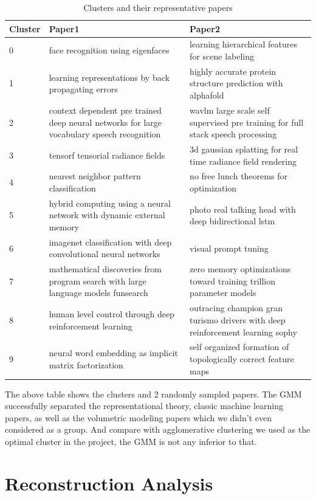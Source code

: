 \documentclass{article}
\begin{document}
\begin{table}
\centering
\begin{tabularx}{\textwidth}{lXX}
\toprule
Cluster & Paper1 & Paper2 \\
\midrule
0 & face recognition using eigenfaces & learning hierarchical features for scene labeling \\
1 & learning representations by back propagating errors & highly accurate protein structure prediction with alphafold \\
2 & context dependent pre trained deep neural networks for large vocabulary speech recognition & wavlm large scale self supervised pre training for full stack speech processing \\
3 & tensorf tensorial radiance fields & 3d gaussian splatting for real time radiance field rendering \\
4 & nearest neighbor pattern classification & no free lunch theorems for optimization \\
5 & hybrid computing using a neural network with dynamic external memory & photo real talking head with deep bidirectional lstm \\
6 & imagenet classification with deep convolutional neural networks & visual prompt tuning \\
7 & mathematical discoveries from program search with large language models funsearch & zero memory optimizations toward training trillion parameter models \\
8 & human level control through deep reinforcement learning & outracing champion gran turismo drivers with deep reinforcement learning sophy \\
9 & neural word embedding as implicit matrix factorization & self organized formation of topologically correct feature maps \\
\bottomrule
\end{tabularx}
\caption{Clusters and their representative papers}
\end{table}

The above table shows the clusters and 2 randomly sampled papers. The GMM successfully separated the representational theory,  classic machine learning papers, as well as the volumetric modeling papers which we didn't even considered as a group. And compare with agglomerative clustering  we used as the optimal cluster in the project, the GMM is not any inferior to that.

\addlinespace
\section*{Reconstruction Analysis}
\end{document}
